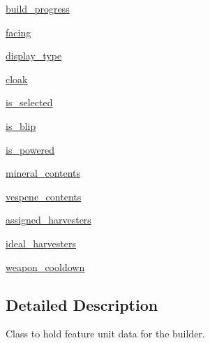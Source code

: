 \begin{DoxyCompactItemize}
\item 
\mbox{\hyperlink{classpysc2_1_1tests_1_1dummy__observation_1_1_feature_unit_a2bee7ca309a259d0aae8185cec757507}{build\+\_\+progress}}
\item 
\mbox{\hyperlink{classpysc2_1_1tests_1_1dummy__observation_1_1_feature_unit_ae4c36a8f2291ab7964e4df4857a4f294}{facing}}
\item 
\mbox{\hyperlink{classpysc2_1_1tests_1_1dummy__observation_1_1_feature_unit_afabea5e860553376cf3214b299735e95}{display\+\_\+type}}
\item 
\mbox{\hyperlink{classpysc2_1_1tests_1_1dummy__observation_1_1_feature_unit_ab5a1aa4dffa1fe0b4fad110a2d8aca34}{cloak}}
\item 
\mbox{\hyperlink{classpysc2_1_1tests_1_1dummy__observation_1_1_feature_unit_a81174e04c9c837ea4236b1c016c1d2b6}{is\+\_\+selected}}
\item 
\mbox{\hyperlink{classpysc2_1_1tests_1_1dummy__observation_1_1_feature_unit_a2f3c12be40ced78a4c7924c3fc286379}{is\+\_\+blip}}
\item 
\mbox{\hyperlink{classpysc2_1_1tests_1_1dummy__observation_1_1_feature_unit_a07e6b73d0e672906022fb4f789f18b17}{is\+\_\+powered}}
\item 
\mbox{\hyperlink{classpysc2_1_1tests_1_1dummy__observation_1_1_feature_unit_a890c00229e399d71a82aeda964cb0b51}{mineral\+\_\+contents}}
\item 
\mbox{\hyperlink{classpysc2_1_1tests_1_1dummy__observation_1_1_feature_unit_a963db004b55761026732a1214aebf98e}{vespene\+\_\+contents}}
\item 
\mbox{\hyperlink{classpysc2_1_1tests_1_1dummy__observation_1_1_feature_unit_ac32fb034d2d1b73d71fcb584d0f6da2a}{assigned\+\_\+harvesters}}
\item 
\mbox{\hyperlink{classpysc2_1_1tests_1_1dummy__observation_1_1_feature_unit_a4519fc0dcdaa63a954bfdb8af3bd8b89}{ideal\+\_\+harvesters}}
\item 
\mbox{\hyperlink{classpysc2_1_1tests_1_1dummy__observation_1_1_feature_unit_aac10330f3e9ea923e3acff05e87928d9}{weapon\+\_\+cooldown}}
\end{DoxyCompactItemize}


\subsection{Detailed Description}
\begin{DoxyVerb}Class to hold feature unit data for the builder.\end{DoxyVerb}
 

